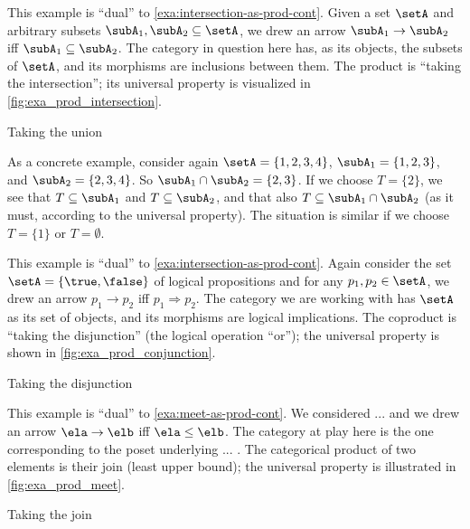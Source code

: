 \begin{example}\label{exa:union-as-coprod-cont}
This example is ``dual'' to \cref{exa:intersection-as-prod-cont}.
Given a set $\setA$ and arbitrary subsets $\subA_1, \subA_2 \subseteq \setA$, we drew an arrow $\subA_1 \to \subA_2$ iff $\subA_1 \subseteq \subA_2$. The category in question here has, as its objects, the subsets of $\setA$, and its morphisms are inclusions between them. The product is ``taking the intersection''; its universal property is visualized in \cref{fig:exa_prod_intersection}. 
  \begin{marginfigure}
  \begin{center}
  \end{center}
    \caption{Taking the union}
    \label{fig:exa_coprod_union_cont}
  \end{marginfigure}
 As a concrete example, consider again $\setA = \{ 1, 2, 3, 4 \}$, $\subA_1 = \{ 1, 2, 3 \}$, and $\subA_2 = \{2, 3, 4 \}$. So $\subA_1 \cap \subA_2 = \{2, 3 \}$. If we choose $T = \{ 2 \}$, we see that $T \subseteq \subA_1$ and $T \subseteq \subA_2$, and that also $T \subseteq \subA_1 \cap \subA_2$ (as it must, according to the universal property). The situation is similar if we choose $T = \{ 1\}$ or $T = \emptyset$. 
\end{example}


\begin{example}\label{exa:disjunction-as-coprod-cont}
This example is ``dual'' to \cref{exa:intersection-as-prod-cont}. Again consider the set $\setA = \{ \true, \false \}$ of logical propositions and for any $p_1, p_2  \in \setA$, we drew an arrow $p_1 \to p_2$ iff $p_1 \Rightarrow p_2$. The category we are working with has $\setA$ as its set of objects, and its morphisms are logical implications. The coproduct is ``taking the disjunction'' (the logical operation ``or''); the universal property is shown in \cref{fig:exa_prod_conjunction}. 
  \begin{marginfigure}
  \begin{center}
  \end{center}
    \caption{Taking the disjunction}
    \label{fig:exa_coprod_disjunction_cont}
  \end{marginfigure}
\end{example}


\begin{example}\label{exa:join-as-coprod-cont}
This example is ``dual'' to \cref{exa:meet-as-prod-cont}. We considered ... and we drew an arrow $\ela \to \elb$ iff $\ela \leq \elb$. The category at play here is the one corresponding to the poset underlying ... . The categorical product of two elements is their join (least upper bound); the universal property is illustrated in \cref{fig:exa_prod_meet}. 
  \begin{marginfigure}
  \begin{center}
  \end{center}
    \caption{Taking the join}
    \label{fig:exa_coprod_join_cont}
  \end{marginfigure}
\end{example}

